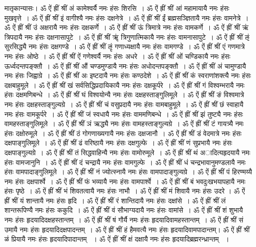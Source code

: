 मातृकान्यासः।
ॐ ऐं ह्रीं श्रीं  अं कामेश्वर्यै  नमः हंसः  शिरसि~। 
ॐ ऐं ह्रीं श्रीं  आं महामायायै  नमः हंसः  मुखवृत्ते~। 
ॐ ऐं ह्रीं श्रीं  इं वागीश्यै  नमः हंसः  दक्षनेत्रे~। 
ॐ ऐं ह्रीं श्रीं  ईं ब्रह्मसञ्ज्ञितायै  नमः हंसः  वामनेत्रे~। 
ॐ ऐं ह्रीं श्रीं  उं अक्षरायै  नमः हंसः  दक्षकर्णे~। 
ॐ ऐं ह्रीं श्रीं  ऊं त्रिमात्रे  नमः हंसः  वामकर्णे~। 
ॐ ऐं ह्रीं श्रीं  ऋं त्रिपदायै  नमः हंसः  दक्षनासापुटे~। 
ॐ ऐं ह्रीं श्रीं  ॠं त्रिगुणात्मिकायै  नमः हंसः  वामनासापुटे~। 
ॐ ऐं ह्रीं श्रीं  ऌं सुरसिद्ध्यै  नमः हंसः  दक्षगण्डे~। 
ॐ ऐं ह्रीं श्रीं  ऌृं गणाध्यक्षायै  नमः हंसः  वामगण्डे~। 
ॐ ऐं ह्रीं श्रीं  एं गणमात्रे  नमः हंसः  ओष्ठे~। 
ॐ ऐं ह्रीं श्रीं  ऐं गणेश्वर्यै  नमः हंसः  अधरे~। 
ॐ ऐं ह्रीं श्रीं  ओं चण्डिकायै  नमः हंसः  ऊर्ध्वदन्तपङ्क्तौ~। 
ॐ ऐं ह्रीं श्रीं  औं चण्डमुण्डायै  नमः हंसः  अधोदन्तपङ्क्तौ~। 
ॐ ऐं ह्रीं श्रीं  अं चामुण्डायै  नमः हंसः  जिह्वाग्रे~। 
ॐ ऐं ह्रीं श्रीं  अः इष्टदायै  नमः हंसः  कण्ठदेशे~। 
ॐ ऐं ह्रीं श्रीं  कं स्वराणांशक्त्यै  नमः हंसः  दक्षबाहुमूले~। 
ॐ ऐं ह्रीं श्रीं  खं सर्वसिद्धिप्रदायिकायै  नमः हंसः  दक्षकूर्परे~। 
ॐ ऐं ह्रीं श्रीं  गं विश्वम्भरायै  नमः हंसः  दक्षमणिबन्धे~। 
ॐ ऐं ह्रीं श्रीं  घं विश्वयोन्यै  नमः हंसः  दक्षहस्ताङ्गुलिमूले~। 
ॐ ऐं ह्रीं श्रीं  ङं विश्वमात्रे  नमः हंसः  दक्षहस्ताङ्गुल्यग्रे~। 
ॐ ऐं ह्रीं श्रीं  चं वसुप्रदायै  नमः हंसः  वामबाहुमूले~। 
ॐ ऐं ह्रीं श्रीं  छं स्वाहायै  नमः हंसः  वामकूर्परे~। 
ॐ ऐं ह्रीं श्रीं  जं स्वधायै  नमः हंसः  वाममणिबन्धे~। 
ॐ ऐं ह्रीं श्रीं  झं तुष्ट्यै  नमः हंसः  वामहस्ताङ्गुलिमूले~। 
ॐ ऐं ह्रीं श्रीं  ञं ऋद्ध्यै  नमः हंसः  वामहस्ताङ्गुल्यग्रे~। 
ॐ ऐं ह्रीं श्रीं  टं गायत्र्यै  नमः हंसः  दक्षोरुमूले~। 
ॐ ऐं ह्रीं श्रीं  ठं गोगणाख्यगायै  नमः हंसः  दक्षजानौ~। 
ॐ ऐं ह्रीं श्रीं  डं वेदमात्रे  नमः हंसः  दक्षपाङ्गुलिमूले~। 
ॐ ऐं ह्रीं श्रीं  ढं वरिष्ठायै  नमः हंसः  दक्षगुल्फे~। 
ॐ ऐं ह्रीं श्रीं  णं सुप्रभायै  नमः हंसः  दक्षपाङ्गुल्यग्रे~। 
ॐ ऐं ह्रीं श्रीं  तं सिद्धवाहिन्यै  नमः हंसः   वामोरुमूले~।
ॐ ऐं ह्रीं श्रीं  थं अादित्यहृदयायै  नमः हंसः  वामजानुनि~। 
ॐ ऐं ह्रीं श्रीं  दं चन्द्रायै  नमः हंसः  वामगुल्फे~। 
ॐ ऐं ह्रीं श्रीं  धं चन्द्रभावानुमण्डलायै  नमः हंसः  वामपादाङ्गुलिमूले~। 
ॐ ऐं ह्रीं श्रीं  नं ज्योत्स्नायै  नमः हंसः  वामपादाङ्गुल्यग्रे~। 
ॐ ऐं ह्रीं श्रीं  पं हिरण्मय्यै  नमः हंसः  दक्षपार्श्वे~। 
ॐ ऐं ह्रीं श्रीं  फं भव्यायै  नमः हंसः   वामपार्श्वे~।
ॐ ऐं ह्रीं श्रीं  बं भवदुःखभयापहायै  नमः हंसः   पृष्ठे~।
ॐ ऐं ह्रीं श्रीं  भं शिवतत्वायै  नमः हंसः  नाभौ~। 
ॐ ऐं ह्रीं श्रीं  मं शिवायै  नमः हंसः  उदरे ।
ॐ ऐं ह्रीं श्रीं  यं शान्तायै  नमः हंसः  हृदि~। 
ॐ ऐं ह्रीं श्रीं  रं शान्तिदायै  नमः हंसः  दक्षांसे~। 
ॐ ऐं ह्रीं श्रीं  लं शान्तरूपिण्यै  नमः हंसः  ककुदि~। 
ॐ ऐं ह्रीं श्रीं  वं सौभाग्यदायै  नमः हंसः वामांसे~।  
ॐ ऐं ह्रीं श्रीं  शं शुभायै  नमः हंसः   हृदयादिदक्षहस्तान्तम्~।
ॐ ऐं ह्रीं श्रीं  षं गौर्यै  नमः हंसः  हृदयादिवामहस्तान्तम्~। 
ॐ ऐं ह्रीं श्रीं  सं उमायै  नमः हंसः  हृदयादिदक्षपादन्तम्~। 
ॐ ऐं ह्रीं श्रीं  हं हैमवत्यै  नमः हंसः  हृदयादिवामपादान्तम्। 
ॐ ऐं ह्रीं श्रीं  ळं प्रियायै  नमः हंसः हृदयादिपादान्तम् ~। 
ॐ ऐं ह्रीं श्रीं  क्षं दक्षायै  नमः हंसः  हृदयादिब्रह्मरन्ध्रान्तम् ~।

